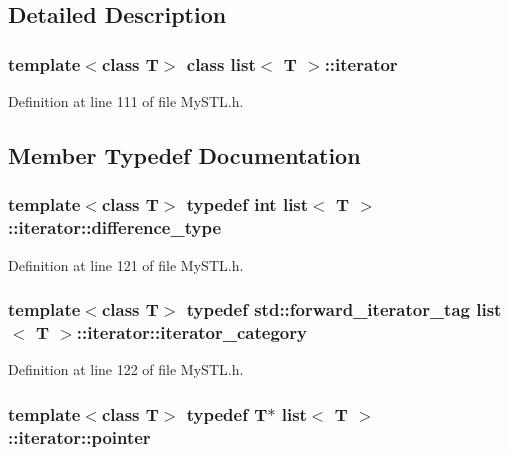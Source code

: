 \subsection{Detailed Description}
\subsubsection*{template$<$class T$>$ class list$<$ T $>$::iterator}



Definition at line 111 of file MySTL.h.



\subsection{Member Typedef Documentation}
\subsubsection[{difference\_\-type}]{\setlength{\rightskip}{0pt plus 5cm}template$<$class T$>$ typedef int {\bf list}$<$ T $>$::{\bf iterator::difference\_\-type}}\label{classlist_1_1iterator_ab83deb8c04d29397c5a52f2b4650c8a2}


Definition at line 121 of file MySTL.h.

\subsubsection[{iterator\_\-category}]{\setlength{\rightskip}{0pt plus 5cm}template$<$class T$>$ typedef std::forward\_\-iterator\_\-tag {\bf list}$<$ T $>$::{\bf iterator::iterator\_\-category}}\label{classlist_1_1iterator_a0fc7ae9079b9de2179f52ef32968d834}


Definition at line 122 of file MySTL.h.

\subsubsection[{pointer}]{\setlength{\rightskip}{0pt plus 5cm}template$<$class T$>$ typedef T$\ast$ {\bf list}$<$ T $>$::{\bf iterator::pointer}}\label{classlist_1_1iterator_ac23aff59f93df3d2faf295726c1d2bba}


